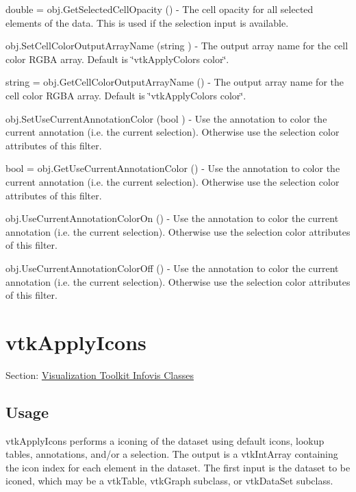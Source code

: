 \begin{DoxyItemize}
\item {\ttfamily double = obj.\-Get\-Selected\-Cell\-Opacity ()} -\/ The cell opacity for all selected elements of the data. This is used if the selection input is available.  
\item {\ttfamily obj.\-Set\-Cell\-Color\-Output\-Array\-Name (string )} -\/ The output array name for the cell color R\-G\-B\-A array. Default is \char`\"{}vtk\-Apply\-Colors color\char`\"{}.  
\item {\ttfamily string = obj.\-Get\-Cell\-Color\-Output\-Array\-Name ()} -\/ The output array name for the cell color R\-G\-B\-A array. Default is \char`\"{}vtk\-Apply\-Colors color\char`\"{}.  
\item {\ttfamily obj.\-Set\-Use\-Current\-Annotation\-Color (bool )} -\/ Use the annotation to color the current annotation (i.\-e. the current selection). Otherwise use the selection color attributes of this filter.  
\item {\ttfamily bool = obj.\-Get\-Use\-Current\-Annotation\-Color ()} -\/ Use the annotation to color the current annotation (i.\-e. the current selection). Otherwise use the selection color attributes of this filter.  
\item {\ttfamily obj.\-Use\-Current\-Annotation\-Color\-On ()} -\/ Use the annotation to color the current annotation (i.\-e. the current selection). Otherwise use the selection color attributes of this filter.  
\item {\ttfamily obj.\-Use\-Current\-Annotation\-Color\-Off ()} -\/ Use the annotation to color the current annotation (i.\-e. the current selection). Otherwise use the selection color attributes of this filter.  
\end{DoxyItemize}\hypertarget{vtkinfovis_vtkapplyicons}{}\section{vtk\-Apply\-Icons}\label{vtkinfovis_vtkapplyicons}
Section\-: \hyperlink{sec_vtkinfovis}{Visualization Toolkit Infovis Classes} \hypertarget{vtkwidgets_vtkxyplotwidget_Usage}{}\subsection{Usage}\label{vtkwidgets_vtkxyplotwidget_Usage}
vtk\-Apply\-Icons performs a iconing of the dataset using default icons, lookup tables, annotations, and/or a selection. The output is a vtk\-Int\-Array containing the icon index for each element in the dataset. The first input is the dataset to be iconed, which may be a vtk\-Table, vtk\-Graph subclass, or vtk\-Data\-Set subclass.

